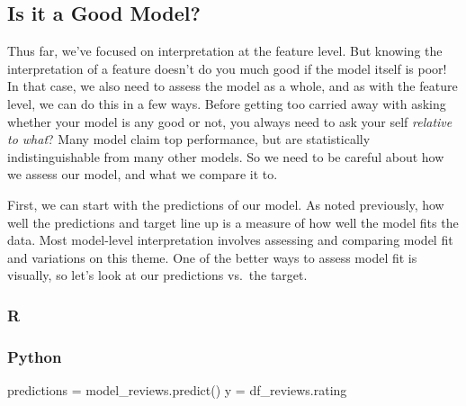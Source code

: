 \documentclass[
  letterpaper,
]{krantz}
\newenvironment{Shaded}{}{}
\newcommand{\FunctionTok}[1]{\textcolor[rgb]{0.02,0.16,0.49}{#1}}
\newcommand{\NormalTok}[1]{#1}
\newcommand{\OperatorTok}[1]{\textcolor[rgb]{0.40,0.40,0.40}{#1}}
\newcommand{\OtherTok}[1]{\textcolor[rgb]{0.00,0.44,0.13}{#1}}
\newcommand{\SpecialCharTok}[1]{\textcolor[rgb]{0.25,0.44,0.63}{#1}}
\begin{document}
\subsection{Is it a Good Model?}\label{is-it-a-good-model}

Thus far, we've focused on interpretation at the feature level. But
knowing the interpretation of a feature doesn't do you much good if the
model itself is poor! In that case, we also need to assess the model as
a whole, and as with the feature level, we can do this in a few ways.
Before getting too carried away with asking whether your model is any
good or not, you always need to ask your self \emph{relative to what}?
Many model claim top performance, but are statistically
indistinguishable from many other models. So we need to be careful about
how we assess our model, and what we compare it to.

First, we can start with the predictions of our model. As noted
previously, how well the predictions and target line up is a measure of
how well the model fits the data. Most model-level interpretation
involves assessing and comparing model fit and variations on this theme.
One of the better ways to assess model fit is visually, so let's look at
our predictions vs.~the target.

\subsubsection{R}

\begin{Shaded}
\end{Shaded}

\subsubsection{Python}

\begin{Shaded}
\begin{Highlighting}[]
\NormalTok{predictions }\OperatorTok{=}\NormalTok{ model\_reviews.predict()}
\NormalTok{y }\OperatorTok{=}\NormalTok{ df\_reviews.rating}
\end{Highlighting}
\end{Shaded}
\end{document}
